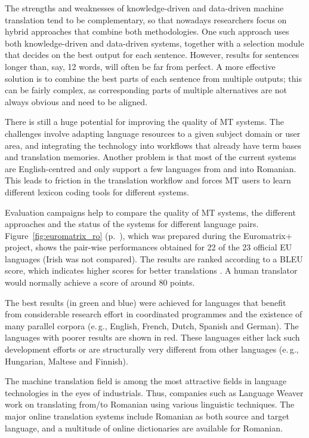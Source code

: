 \begin{multicols}{2}
The strengths and weaknesses of knowledge-driven and data-driven machine translation tend to be complementary, so that nowadays researchers focus on hybrid approaches that combine both methodologies. One such approach uses both knowledge-driven and data-driven systems, together with a selection module that decides on the best output for each sentence. However, results for sentences longer than, say, 12 words, will often be far from perfect. A more effective solution is to combine the best parts of each sentence from multiple outputs; this can be fairly complex, as corresponding parts of multiple alternatives are not always obvious and need to be aligned. 

There is still a huge potential for improving the quality of MT systems. The challenges involve adapting language resources to a given subject domain or user area, and integrating the technology into workflows that already have term bases and translation memories. Another problem is that most of the current systems are English-centred and only support a few languages from and into Romanian. This leads to friction in the translation workflow and forces MT users to learn different lexicon coding tools for different systems.

Evaluation campaigns help to compare the quality of MT systems, the different approaches and the status of the systems for different language pairs. Figure~\ref{fig:euromatrix_ro} (p.~\pageref{fig:euromatrix_ro}), which was prepared during the Euromatrix+ project, shows the pair-wise performances obtained for 22 of the 23 official EU languages (Irish was not compared). The results are ranked according to a BLEU score, which indicates higher scores for better translations \cite{bleu1}. A human translator would normally achieve a score of around 80 points.

The best results (in green and blue) were achieved for languages that benefit from considerable research effort in coordinated programmes and the existence of many parallel corpora (e.\,g., English, French, Dutch, Spanish and German). The languages with poorer results are shown in red. These languages either lack such development efforts or are structurally very different from other languages (e.\,g., Hungarian, Maltese and Finnish).

The machine translation field is among the most attractive fields in language technologies in the eyes of industrials. Thus, companies such as Language Weaver work on translating from/to Romanian using various linguistic techniques. The major online translation systems include Romanian as both source and target language, and a multitude of online dictionaries are available for Romanian.


\end{multicols}
